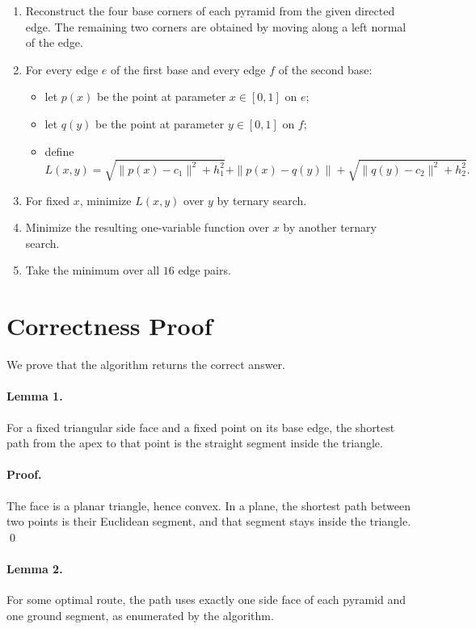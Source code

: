 \documentclass[11pt]{article}
\begin{document}
\begin{enumerate}[leftmargin=*]
    \item Reconstruct the four base corners of each pyramid from the given directed edge. The remaining
    two corners are obtained by moving along a left normal of the edge.
    \item For every edge $e$ of the first base and every edge $f$ of the second base:
    \begin{itemize}[leftmargin=*]
        \item let $p(x)$ be the point at parameter $x \in [0,1]$ on $e$;
        \item let $q(y)$ be the point at parameter $y \in [0,1]$ on $f$;
        \item define
        \[
        L(x,y)=\sqrt{\|p(x)-c_1\|^2+h_1^2}+\|p(x)-q(y)\|+\sqrt{\|q(y)-c_2\|^2+h_2^2}.
        \]
    \end{itemize}
    \item For fixed $x$, minimize $L(x,y)$ over $y$ by ternary search.
    \item Minimize the resulting one-variable function over $x$ by another ternary search.
    \item Take the minimum over all $16$ edge pairs.
\end{enumerate}

\section*{Correctness Proof}

We prove that the algorithm returns the correct answer.

\paragraph{Lemma 1.}
For a fixed triangular side face and a fixed point on its base edge, the shortest path from the apex to
that point is the straight segment inside the triangle.

\paragraph{Proof.}
The face is a planar triangle, hence convex. In a plane, the shortest path between two points is their
Euclidean segment, and that segment stays inside the triangle. \qed

\paragraph{Lemma 2.}
For some optimal route, the path uses exactly one side face of each pyramid and one ground segment, as
enumerated by the algorithm.
\end{document}
